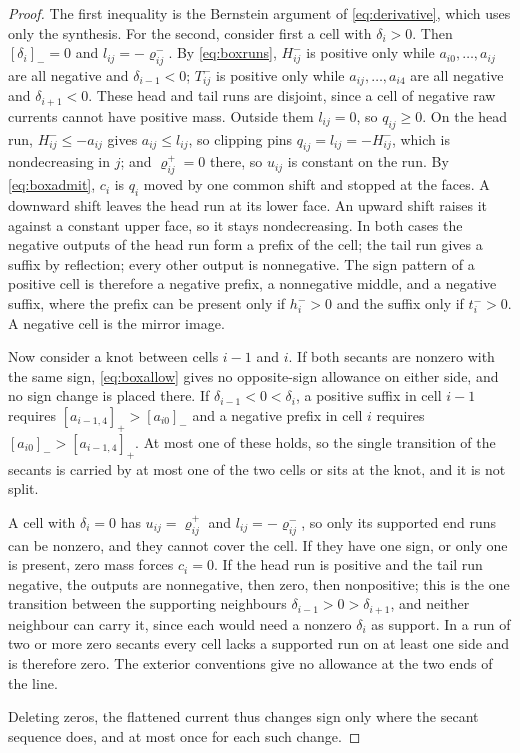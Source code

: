 \documentclass[journal]{IEEEtran}
\begin{document}
\begin{proof}
The first inequality is the Bernstein argument of
\eqref{eq:derivative}, which uses only the synthesis. For the second,
consider first a cell with \(\delta_i>0\). Then \([\delta_i]_-=0\) and
\(l_{ij}=-\varrho_{ij}^-\). By \eqref{eq:boxruns}, \(H_{ij}^-\) is positive
only while \(a_{i0},\ldots,a_{ij}\) are all negative and
\(\delta_{i-1}<0\); \(T_{ij}^-\) is positive only while
\(a_{ij},\ldots,a_{i4}\) are all negative and \(\delta_{i+1}<0\). These
head and tail runs are disjoint, since a cell of negative raw currents
cannot have positive mass. Outside them \(l_{ij}=0\), so \(q_{ij}\ge0\).
On the head run, \(H_{ij}^-\le-a_{ij}\) gives \(a_{ij}\le l_{ij}\), so
clipping pins \(q_{ij}=l_{ij}=-H_{ij}^-\), which is nondecreasing in
\(j\); and \(\varrho_{ij}^+=0\) there, so \(u_{ij}\) is constant on the
run. By \eqref{eq:boxadmit}, \(c_i\) is \(q_i\) moved by one common shift
and stopped at the faces. A downward shift leaves the head run at its
lower face. An upward shift raises it against a constant upper face, so
it stays nondecreasing. In both cases the negative outputs of the head
run form a prefix of the cell; the tail run gives a suffix by reflection;
every other output is nonnegative. The sign pattern of a positive cell is
therefore a negative prefix, a nonnegative middle, and a negative suffix,
where the prefix can be present only if \(h_i^->0\) and the suffix only if
\(t_i^->0\). A negative cell is the mirror image.

Now consider a knot between cells \(i-1\) and \(i\). If both secants are
nonzero with the same sign, \eqref{eq:boxallow} gives no opposite-sign
allowance on either side, and no sign change is placed there. If
\(\delta_{i-1}<0<\delta_i\), a positive suffix in cell \(i-1\) requires
\([a_{i-1,4}]_+>[a_{i0}]_-\) and a negative prefix in cell \(i\) requires
\([a_{i0}]_->[a_{i-1,4}]_+\). At most one of these holds, so the single
transition of the secants is carried by at most one of the two cells or
sits at the knot, and it is not split.

A cell with \(\delta_i=0\) has \(u_{ij}=\varrho_{ij}^+\) and
\(l_{ij}=-\varrho_{ij}^-\), so only its supported end runs can be nonzero,
and they cannot cover the cell. If they have one sign, or only one is
present, zero mass forces \(c_i=0\). If the head run is positive and the
tail run negative, the outputs are nonnegative, then zero, then
nonpositive; this is the one transition between the supporting
neighbours \(\delta_{i-1}>0>\delta_{i+1}\), and neither neighbour can
carry it, since each would need a nonzero \(\delta_i\) as support. In a
run of two or more zero secants every cell lacks a supported run on at
least one side and is therefore zero. The exterior conventions give no
allowance at the two ends of the line.

Deleting zeros, the flattened current thus changes sign only where the
secant sequence does, and at most once for each such change.
\end{proof}
\end{document}
